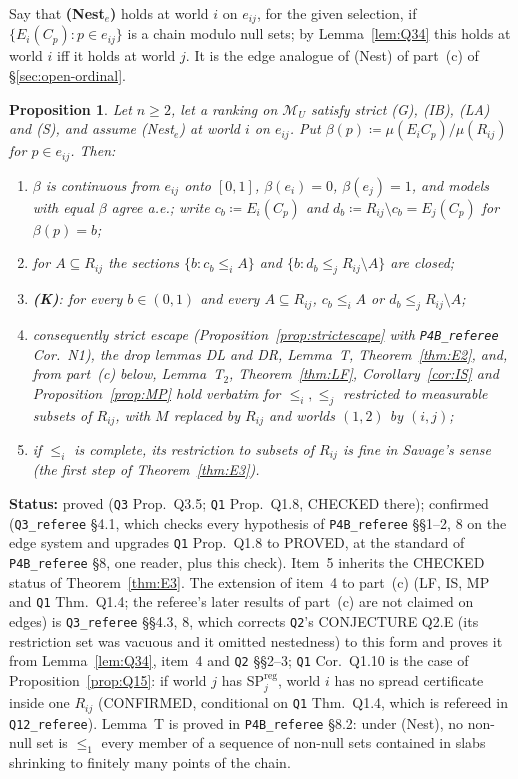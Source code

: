 \documentclass[11pt]{article}
\newtheorem{proposition}[theorem]{Proposition}
\theoremstyle{definition}
\theoremstyle{remark}
\newcommand{\M}{\mathcal M}
\newcommand{\src}[1]{\texttt{#1}}
\newcommand{\status}[1]{\par\smallskip\noindent\textbf{Status:} #1\par\smallskip}
\begin{document}
Say that \textbf{(Nest$_e$)} holds at world $i$ on $e_{ij}$, for the given selection, if $\{E_i(C_p):p\in e_{ij}\}$ is a chain modulo null sets; by Lemma~\ref{lem:Q34} this holds at world $i$ iff it holds at world $j$. It is the edge analogue of (Nest) of part~(c) of \S\ref{sec:open-ordinal}.

\begin{proposition}\label{prop:Q35}
Let $n\ge2$, let a ranking on $\M_U$ satisfy strict (G), (IB), (LA) and (S), and assume (Nest$_e$) at world $i$ on $e_{ij}$. Put $\beta(p)\coloneqq\mu(E_iC_p)/\mu(R_{ij})$ for $p\in e_{ij}$. Then:
\begin{enumerate}[leftmargin=*,label=(\arabic*)]
\item $\beta$ is continuous from $e_{ij}$ onto $[0,1]$, $\beta(e_i)=0$, $\beta(e_j)=1$, and models with equal $\beta$ agree a.e.; write $c_b\coloneqq E_i(C_p)$ and $d_b\coloneqq R_{ij}\setminus c_b=E_j(C_p)$ for $\beta(p)=b$;
\item for $A\subseteq R_{ij}$ the sections $\{b:c_b\le_iA\}$ and $\{b:d_b\le_jR_{ij}\setminus A\}$ are closed;
\item \textbf{(K)}: for every $b\in(0,1)$ and every $A\subseteq R_{ij}$, $c_b\le_iA$ or $d_b\le_jR_{ij}\setminus A$;
\item consequently strict escape (Proposition~\ref{prop:strictescape} with \src{P4B\_referee} Cor.~N1), the drop lemmas DL and DR, Lemma~T, Theorem~\ref{thm:E2}, and, from part~(c) below, Lemma~T$_2$, Theorem~\ref{thm:LF}, Corollary~\ref{cor:IS} and Proposition~\ref{prop:MP} hold verbatim for $\le_i,\le_j$ restricted to measurable subsets of $R_{ij}$, with $M$ replaced by $R_{ij}$ and worlds $(1,2)$ by $(i,j)$;
\item if $\le_i$ is complete, its restriction to subsets of $R_{ij}$ is fine in Savage's sense (the first step of Theorem~\ref{thm:E3}).
\end{enumerate}
\end{proposition}
\status{proved (\src{Q3} Prop.~Q3.5; \src{Q1} Prop.~Q1.8, CHECKED there); confirmed (\src{Q3\_referee} \S4.1, which checks every hypothesis of \src{P4B\_referee} \S\S1--2, 8 on the edge system and upgrades \src{Q1} Prop.~Q1.8 to PROVED, at the standard of \src{P4B\_referee} \S8, one reader, plus this check). Item~5 inherits the CHECKED status of Theorem~\ref{thm:E3}. The extension of item~4 to part~(c) (LF, IS, MP and \src{Q1} Thm.~Q1.4; the referee's later results of part~(c) are not claimed on edges) is \src{Q3\_referee} \S\S4.3, 8, which corrects \src{Q2}'s CONJECTURE Q2.E (its restriction set was vacuous and it omitted nestedness) to this form and proves it from Lemma~\ref{lem:Q34}, item~4 and \src{Q2} \S\S2--3; \src{Q1} Cor.~Q1.10 is the case of Proposition~\ref{prop:Q15}: if world $j$ has SP$^{\mathrm{reg}}_j$, world $i$ has no spread certificate inside one $R_{ij}$ (CONFIRMED, conditional on \src{Q1} Thm.~Q1.4, which is refereed in \src{Q12\_referee}). Lemma~T is proved in \src{P4B\_referee} \S8.2: under (Nest), no non-null set is $\le_1$ every member of a sequence of non-null sets contained in slabs shrinking to finitely many points of the chain.}
\end{document}
